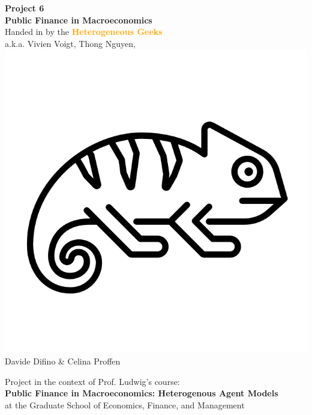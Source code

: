 \documentclass[12pt,a4paper]{article}
\begin{document}
\begin{center}
       \vspace*{4cm}
       \huge\textbf{Project 6} \\
       \vspace{0.4cm}
       \large \textbf{Public Finance in Macroeconomics} \\
       \vspace{0.5cm}
        \large Handed in by the \textcolor{orange}{\textbf{Heterogeneous Geeks}} \\
        \vspace{0.3cm}
        a.k.a. Vivien Voigt, Thong Nguyen, \includegraphics[scale=0.06]{geek.png}\\Davide Difino \& Celina Proffen \\
       \vspace{1.5cm}
       \vfill



        Project in the context of Prof. Ludwig's course: \\
        \textbf{Public Finance in Macroeconomics: Heterogenous Agent Models}\\
        at the Graduate School of Economics, Finance, and Management
       \vspace{0.8cm}
   \end{center}
\end{document}
